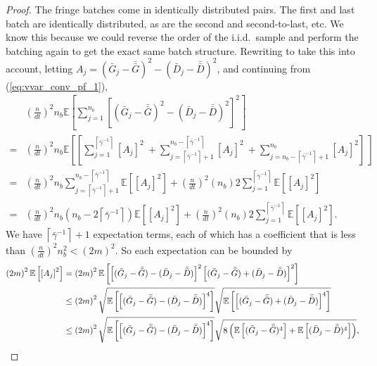 \documentclass[12pt]{article}
\newcommand{\e}[1]{\mathbb{E} \left[ #1 \right]
}
\newcommand{\gammab}{\bar{\gamma}}
\newcommand{\gb}{\bar{G}}
\newcommand{\gbb}{\bar{\gb}}
\newcommand{\db}{\bar{D}}
\newcommand{\dbb}{\bar{\db}}
\begin{document}
\begin{proof}
	The fringe batches come in identically distributed pairs.  
        The first and last batch are identically distributed, as are the second and second-to-last, etc.  
        We know this because we could reverse the order of the i.i.d.\ sample and perform the batching again to get the exact same batch structure.  
        Rewriting to take this into account, letting $A_j = (\gb_j - \gbb)^2 - (\db_j - \dbb)^2$, and continuing from (\ref{eq:vvar_conv_pf_1}),
	\begin{align*}
		& \left( \frac{n}{dt} \right)^2 n_b \e{ \sum_{j=1}^{n_b} \left[ (\gb_j - \gbb)^2 - (\db_j - \dbb)^2 \right]^2 } \\
		 =  & \left( \frac{n}{dt} \right)^2 n_b \e{\left[ \sum_{j=1}^{\left\lceil \gammab^{-1} \right\rceil} \left[ A_j \right]^2 \
		 + \sum_{j=\left\lceil \gammab^{-1} \right\rceil+1}^{n_b-\left\lceil \gammab^{-1} \right\rceil} \left[ A_j \right]^2 \
		 + \sum_{j=n_b-\left\lceil \gammab^{-1} \right\rceil+1}^{n_b} \left[ A_j \right]^2 \right]\
		} \\
		 = & \left( \frac{n}{dt} \right)^2 n_b \sum_{j=\left\lceil \gammab^{-1} \right\rceil+1}^{n_b-\left\lceil \gammab^{-1} \right\rceil} \e{ \left[ A_j \right]^2 } + \left( \frac{n}{dt} \right)^2 (n_b) 2\sum_{j=1}^{\left\lceil \gammab^{-1} \right\rceil} \e{ \left[ A_j \right]^2 } \\
		 = & \left( \frac{n}{dt} \right)^2 n_b \left(n_b - 2\left\lceil \gammab^{-1} \right\rceil \right) \e{ \left[ A_j \right]^2 }
		+ \left( \frac{n}{dt} \right)^2 (n_b) 2\sum_{j=1}^{\left\lceil \gammab^{-1} \right\rceil} \e{ \left[ A_j \right]^2 }.
	\end{align*}	
	We have $\left\lceil \gammab^{-1} \right\rceil + 1$ expectation terms, each of which has a coefficient that is less than $\left(\frac{n}{dt}\right)^2n_b^2 < (2m)^2$.  
        So each expectation can be bounded by
	\begin{align}
		\left( 2m \right)^2 \e{ \left[ A_j \right]^2 } & = \left( 2m \right)^2 \e{ \left[(\gb_j - \gbb) - (\db_j - \dbb)\right]^2 \left[(\gb_j - \gbb) + (\db_j - \dbb)\right]^2 } \notag \\
		& \leq \left( 2m \right)^2 \sqrt{\e{\left[(\gb_j - \gbb) - (\db_j - \dbb)\right]^4}} \sqrt{\e{\left[(\gb_j - \gbb) + (\db_j - \dbb)\right]^4 }} \label{eq:var_reduct_cauchy2} \\
		& \leq \left( 2m \right)^2 \sqrt{\e{\left[(\gb_j - \gbb) - (\db_j - \dbb)\right]^4}} \sqrt{8 \left(\e{(\gb_j - \gbb)^4} + \e{(\db_j - \dbb)^4} \right)}, \label{eq:var_reduct_holder2}
	\end{align}

\end{proof}
\end{document}
